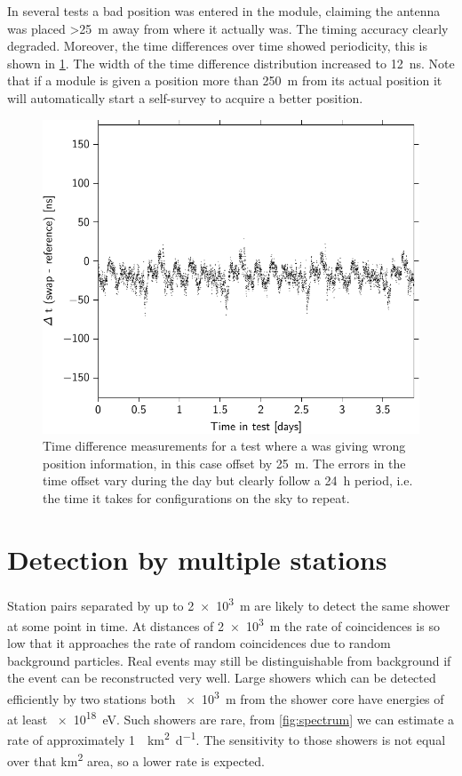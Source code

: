 In several tests a bad position was entered in the \gps module, claiming the \gps antenna was placed \SI{>25}{\meter} away from where it actually was. The timing accuracy clearly degraded. Moreover, the time differences over time showed periodicity, this is shown in \cref{fig:tt_delta_time_022}. The width of the time difference distribution increased to \SI{12}{\ns}. Note that if a \gps module is given a position more than \SI{250}{\meter} from its actual position it will automatically start a self-survey to acquire a better position.

\begin{figure}
    \centering
    \includegraphics{plots/cluster/tt_delta_time_022}
    \caption{Time difference measurements for a test where a \gps was giving wrong position information, in this case offset by \SI{25}{\meter}. The errors in the time offset vary during the day but clearly follow a \SI{24}{\hour} period, i.e. the time it takes for \gps configurations on the sky to repeat.}
    \label{fig:tt_delta_time_022}
\end{figure}


\section{Detection by multiple stations}

Station pairs separated by up to \SI{2e3}{\meter} are likely to detect the same shower at some point in time. At distances of \SI{2e3}{\meter} the rate of coincidences is so low that it approaches the rate of random coincidences due to random background particles. Real events may still be distinguishable from background if the event can be reconstructed very well. Large showers which can be detected efficiently by two stations both \SI{e3}{\meter} from the shower core have energies of at least \SI{e18}{\eV}. Such showers are rare, from \cref{fig:spectrum} we can estimate a rate of approximately \SI{1}{\per\kilo\meter\squared\per\day}. The sensitivity to those showers is not equal over that \si{\kilo\meter\squared} area, so a lower rate is expected.

